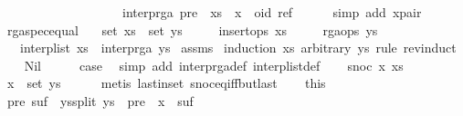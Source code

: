 \begin{isabellebody}
\ \ \ \ \ \ \ \ \ \ \ \ \ \ \ \ \ \ \ interp{\isacharunderscore}rga\ {\isacharparenleft}pre\ {\isacharat}\ {\isacharparenleft}xs\ {\isacharat}\ {\isacharbrackleft}x{\isacharbrackright}{\isacharparenright}\ {\isacharat}\ {\isacharbrackleft}{\isacharparenleft}oid{\isacharcomma}\ ref{\isacharparenright}{\isacharbrackright}{\isacharparenright}{\isachardoublequoteclose}\isanewline
\ \ \ \ \isamarkupfalse%
\ {\isacharparenleft}simp\ add{\isacharcolon}\ x{\isacharunderscore}pair{\isacharparenright}\isanewline
{}\isamarkupfalse%
%
\endisatagproof
{\isafoldproof}%
%
\isadelimproof
\isanewline
%
\endisadelimproof
\isanewline
{}\isamarkupfalse%
\ rga{\isacharunderscore}spec{\isacharunderscore}equal{\isacharcolon}\isanewline
\ \ \ {\isachardoublequoteopen}set\ xs\ {\isacharequal}\ set\ ys{\isachardoublequoteclose}\isanewline
\ \ \ \ \ {\isachardoublequoteopen}insert{\isacharunderscore}ops\ xs{\isachardoublequoteclose}\isanewline
\ \ \ \ \ {\isachardoublequoteopen}rga{\isacharunderscore}ops\ ys{\isachardoublequoteclose}\isanewline
\ \ \ {\isachardoublequoteopen}interp{\isacharunderscore}list\ xs\ {\isacharequal}\ interp{\isacharunderscore}rga\ ys{\isachardoublequoteclose}\isanewline
%
\isadelimproof
%
\endisadelimproof
%
\isatagproof
{}\isamarkupfalse%
\ assms\ \isamarkupfalse%
{\isacharparenleft}induction\ xs\ arbitrary{\isacharcolon}\ ys\ rule{\isacharcolon}\ rev{\isacharunderscore}induct{\isacharparenright}\isanewline
\ \ \isamarkupfalse%
\ Nil\isanewline
\ \ \isamarkupfalse%
\ \isamarkupfalse%
\ {\isacharquery}case\ \isamarkupfalse%
\ {\isacharparenleft}simp\ add{\isacharcolon}\ interp{\isacharunderscore}rga{\isacharunderscore}def\ interp{\isacharunderscore}list{\isacharunderscore}def{\isacharparenright}\isanewline
{}\isamarkupfalse%
\isanewline
\ \ \isamarkupfalse%
\ {\isacharparenleft}snoc\ x\ xs{\isacharparenright}\isanewline
\ \ \isamarkupfalse%
\ {\isachardoublequoteopen}x\ {\isasymin}\ set\ ys{\isachardoublequoteclose}\isanewline
\ \ \ \ \isamarkupfalse%
\ {\isacharparenleft}metis\ last{\isacharunderscore}in{\isacharunderscore}set\ snoc{\isacharunderscore}eq{\isacharunderscore}iff{\isacharunderscore}butlast{\isacharparenright}\isanewline
\ \ \isamarkupfalse%
\ this\ \isamarkupfalse%
\ pre\ suf\ \ ys{\isacharunderscore}split{\isacharcolon}\ {\isachardoublequoteopen}ys\ {\isacharequal}\ pre\ {\isacharat}\ {\isacharbrackleft}x{\isacharbrackright}\ {\isacharat}\ suf{\isachardoublequoteclose}\isanewline

\end{isabellebody}
